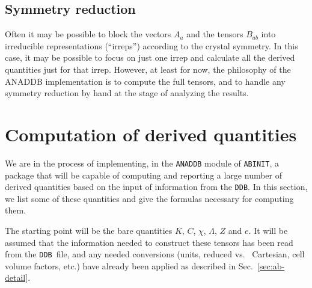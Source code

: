 \documentclass[11pt,fleqn]{article}
\def\E{{\cal E}}
\def\ABINIT{{{\tt ABINIT}}}
\def\DDB{{\tt DDB}}
\begin{document}

\subsection{Symmetry reduction}

Often it may be possible to block the vectors $A_a$ and the
tensors $B_{ab}$ into irreducible representations (``irreps'') according
to the crystal symmetry.  In this case, it may be possible to
focus on just one irrep and calculate all the derived quantities just
for that irrep.  However, at least for now, the philosophy of the
ANADDB implementation is to compute the full tensors, and to handle
any symmetry reduction by hand at the stage of analyzing the results.


\section{Computation of derived quantities}
\label{sec:deriv}

We are in the process of implementing, in the {\tt ANADDB} module
of {\tt ABINIT}, a package that will be capable of computing and
reporting a large number of derived quantities based on the input
of information from the \DDB.  In this section, we list some of
these quantities and give the formulas necessary for computing them.


The starting point will be the bare quantities
$K$, $C$, $\chi$, $\Lambda$, $Z$ and $e$.  It will be assumed that
the information needed to construct these tensors has been read from
the \DDB\ file, and any needed conversions (units, reduced vs.~
Cartesian, cell volume factors, etc.) have already been applied
as described in Sec.~\ref{sec:ab-detail}.
\end{document}
